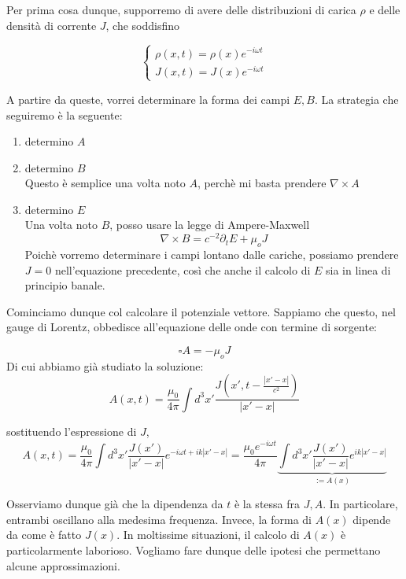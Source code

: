 \documentclass{report}
\begin{document}
    Per prima cosa dunque, supporremo di avere delle distribuzioni di carica $\rho$ e delle densità di corrente $J$, che soddisfino

    \[\begin{cases}
        \rho(x, t) = \rho(x)e^{-i\omega t} \\ J(x, t) = J(x)e^{-i\omega t}
    \end{cases}\]

    A partire da queste, vorrei determinare la forma dei campi $E, B$. La strategia che seguiremo è la seguente: 
    \begin{enumerate}
        \item determino $A$ 
        \item determino $B$ \\
        Questo è semplice una volta noto $A$, perchè mi basta prendere $\nabla \times A$
        \item determino $E$ \\
        Una volta noto $B$, posso usare la legge di Ampere-Maxwell 
        \begin{equation}
            \nabla \times B = c^{-2}\partial_tE + \mu_oJ
        \end{equation}
        Poichè vorremo determinare i campi lontano dalle cariche, possiamo prendere $J=0$ nell'equazione precedente, così che anche il calcolo di $E$ sia in linea di principio banale. 
    \end{enumerate}

    Cominciamo dunque col calcolare il potenziale vettore. Sappiamo che questo, nel gauge di Lorentz, obbedisce all'equazione delle onde con termine di sorgente: 

    \begin{equation}
        \square A = -\mu_o J
    \end{equation}
    Di cui abbiamo già studiato la soluzione: 
    \begin{equation}
        A(x, t) = \frac{\mu_0}{4\pi}\int d^3x' \frac{J(x', t - \frac{|x'-x|}{c^2})}{|x'-x|}
    \end{equation}

    sostituendo l'espressione di $J$, 
    \begin{equation}
        A(x, t) = \frac{\mu_0}{4\pi}\int d^3x' \frac{J(x')}{|x'-x|}e^{-i\omega t + ik|x'-x|} = \frac{\mu_0e^{-i\omega t}}{4\pi} \underbrace{\int d^3x'\frac{J(x')}{|x'-x|}e^{ik|x'-x|}}_{:= A(x)}
    \end{equation}

    Osserviamo dunque già che la dipendenza da $t$ è la stessa fra $J, A$. In particolare, entrambi oscillano alla medesima frequenza. Invece, la forma di $A(x)$ dipende da come è fatto $J(x)$. In moltissime situazioni, il calcolo di $A(x)$ è particolarmente laborioso. Vogliamo fare dunque delle ipotesi che permettano alcune approssimazioni. \\
\end{document}
